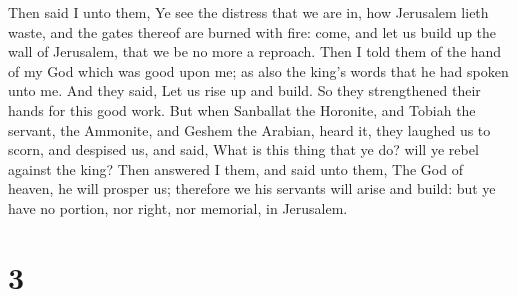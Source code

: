  Then said I unto them, Ye see the distress that we are in,
how Jerusalem lieth waste, and the gates thereof are burned with fire:
come, and let us build up the wall of Jerusalem, that we be no more a
reproach.  Then I told them of the hand of my God which was
good upon me; as also the king's words that he had spoken unto me. And
they said, Let us rise up and build. So they strengthened their hands
for this good work.  But when Sanballat the Horonite, and
Tobiah the servant, the Ammonite, and Geshem the Arabian, heard it, they
laughed us to scorn, and despised us, and said, What is this thing that
ye do? will ye rebel against the king?  Then answered I
them, and said unto them, The God of heaven, he will prosper us;
therefore we his servants will arise and build: but ye have no portion,
nor right, nor memorial, in Jerusalem.

\hypertarget{section-2}{%
\section{3}\label{section-2}}

